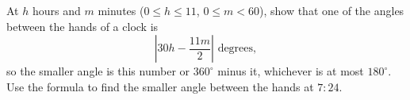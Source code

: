 At $h$ hours and $m$ minutes ($0\le h\le11$, $0\le m<60$), show that one of the angles between the hands of a clock is
\[
\left|30h-\dfrac{11m}{2}\right|\text{ degrees},
\]
so the smaller angle is this number or $360^\circ$ minus it, whichever is at most $180^\circ$. Use the formula to find the smaller angle between the hands at $7{:}24$.
